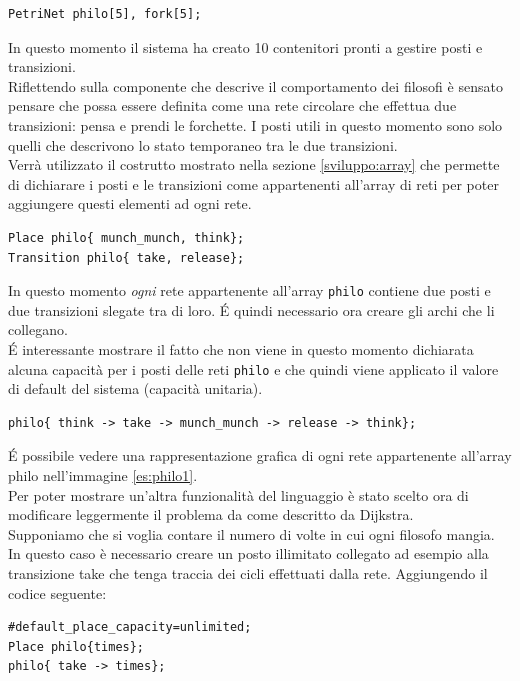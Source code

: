 \documentclass[italian,12pt]{book}
\begin{document}
\begin{verbatim}PetriNet philo[5], fork[5];
\end{verbatim}

In questo momento il sistema ha creato 10 contenitori pronti a gestire posti e transizioni.\\
Riflettendo sulla componente che descrive il comportamento dei filosofi è sensato pensare 
che possa essere definita come una rete circolare che effettua due transizioni: pensa e prendi
le forchette. I posti utili in questo momento sono solo quelli che descrivono lo stato 
temporaneo tra le due transizioni.\\
Verrà utilizzato il costrutto mostrato nella sezione \ref{sviluppo:array} che permette di 
dichiarare i posti e le transizioni come appartenenti all'array di reti per poter aggiungere 
questi elementi ad ogni rete.

\begin{verbatim}Place philo{ munch_munch, think};
Transition philo{ take, release};
\end{verbatim}

In questo momento \emph{ogni} rete appartenente all'array {\tt philo} contiene due posti
e due transizioni slegate tra di loro. \'E quindi necessario ora creare gli archi che li collegano. \\
\'E interessante mostrare il fatto che non viene in questo momento dichiarata alcuna capacità 
per i posti delle reti {\tt philo} e che quindi viene applicato il valore di default del sistema (capacità
unitaria).

\begin{verbatim}philo{ think -> take -> munch_munch -> release -> think};
\end{verbatim}

\'E possibile vedere una rappresentazione grafica di ogni rete 
appartenente all'array philo nell'immagine \ref{es:philo1}. \\
Per poter mostrare un'altra funzionalità del linguaggio è stato scelto ora di modificare 
leggermente il problema da come descritto da Dijkstra. \\
Supponiamo che si voglia contare il numero di volte in cui ogni filosofo mangia. In questo caso
è necessario creare un posto illimitato collegato ad esempio alla transizione take che 
tenga traccia dei cicli effettuati dalla rete. Aggiungendo il codice seguente:

\begin{verbatim}#default_place_capacity=unlimited;
Place philo{times};
philo{ take -> times};
\end{verbatim}
\end{document}
